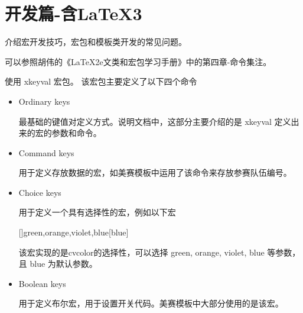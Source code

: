 %
%
%
%


\section{开发篇-含LaTeX3}

介绍宏开发技巧，宏包和模板类开发的常见问题。



可以参照胡伟的《LaTeX2e文类和宏包学习手册》中的第四章-命令集注。



使用 xkeyval 宏包。
该宏包主要定义了以下四个命令
\begin{itemize}
  \item Ordinary keys

    最基础的键值对定义方式。说明文档中，这部分主要介绍的是 xkeyval 定义出来的宏的参数和命令。

  \item Command keys

    用于定义存放数据的宏，如美赛模板中运用了该命令来存放参赛队伍编号。

  \item Choice keys

    用于定义一个具有选择性的宏，例如以下宏
\begin{texlist}
  [\val\ar]{green,orange,violet,blue}[blue]{
    \ifcase\ar\relax
    \or
    \or
    \else
    \fi
  }
\end{texlist}
  该宏实现的是cvcolor的选择性，可以选择 green, orange, violet, blue 等参数，且 blue 为默认参数。

  \item Boolean keys

    用于定义布尔宏，用于设置开关代码。美赛模板中大部分使用的是该宏。
\end{itemize}

